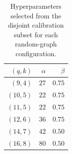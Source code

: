 \begin{table}[!h]
\centering
\caption{Hyperparameters selected from the disjoint calibration subset for each random-graph configuration.}
\label{tab:hyperparameters_random_graphs}
\begin{tabular}{rrr}
\toprule
$(q,k)$ & $\alpha$ & $\beta$ \\
\midrule
$(9,4)$ & $27$ & $0.75$ \\
$(10,5)$ & $22$ & $0.75$ \\
$(11,5)$ & $22$ & $0.75$ \\
$(12,6)$ & $36$ & $0.75$ \\
$(14,7)$ & $42$ & $0.50$ \\
$(16,8)$ & $80$ & $0.50$ \\
\bottomrule
\end{tabular}
\end{table}
